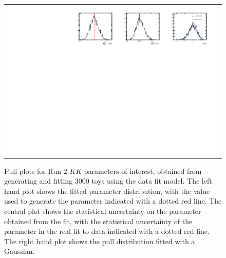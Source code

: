 \begin{figure}
\begin{tabular}{c}
\includegraphics[width=\textwidth]{ANA_resources/Plots/Data_fit/FitterBias//R_ds_KK_run2.pdf} \\
  \end{tabular}
  \caption{Pull plots for Run 2 $KK$ parameters of interest, obtained from generating and fitting 3000 toys using the data fit model. The left hand plot shows the fitted parameter distribution, with the value used to generate the parameter indicated with a dotted red line. The central plot shows the statistical uncertainty on the parameter obtained from the fit, with the statistical uncertainty of the parameter in the real fit to data indicated with a dotted red line. The right hand plot shows the pull distribution fitted with a Gaussian.}
\label{fig:KK_run2_pulls}
\end{figure}
